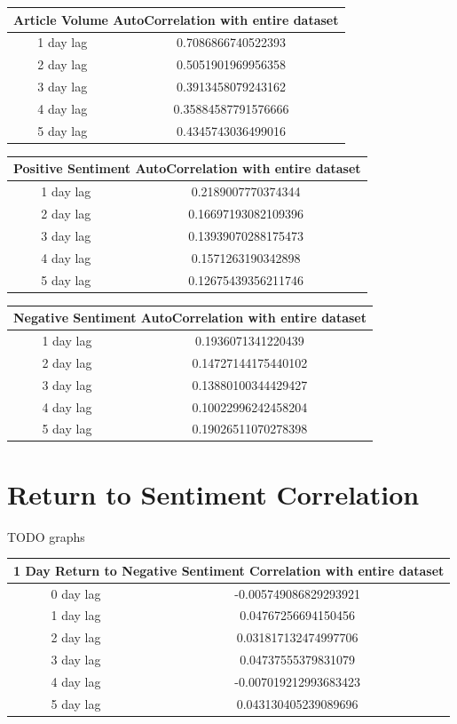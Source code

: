 \begin{center}
\begin{tabular}{ c c }
\hline
\multicolumn{2}{|c|}{Article Volume AutoCorrelation with entire dataset} \\
\hline
1 day lag & 0.7086866740522393 \\
2 day lag & 0.5051901969956358 \\
3 day lag & 0.3913458079243162 \\
4 day lag & 0.35884587791576666 \\
5 day lag & 0.4345743036499016
\end{tabular}
\end{center}

\begin{center}
\begin{tabular}{ c c }
\hline
\multicolumn{2}{|c|}{Positive Sentiment AutoCorrelation with entire dataset} \\
\hline
1 day lag & 0.2189007770374344 \\
2 day lag & 0.16697193082109396 \\
3 day lag & 0.13939070288175473 \\
4 day lag & 0.1571263190342898 \\
5 day lag & 0.12675439356211746
\end{tabular}
\end{center}

\begin{center}
\begin{tabular}{ c c }
\hline
\multicolumn{2}{|c|}{Negative Sentiment AutoCorrelation with entire dataset} \\
\hline
1 day lag & 0.1936071341220439 \\
2 day lag & 0.14727144175440102 \\
3 day lag & 0.13880100344429427 \\
4 day lag & 0.10022996242458204 \\
5 day lag & 0.19026511070278398
\end{tabular}
\end{center}

\section{Return to Sentiment Correlation}

TODO graphs

\begin{center}
\begin{tabular}{ c c }
\hline
\multicolumn{2}{|c|}{1 Day Return to Negative Sentiment Correlation with entire dataset} \\
\hline
0 day lag & -0.005749086829293921 \\
1 day lag & 0.04767256694150456 \\
2 day lag & 0.031817132474997706 \\
3 day lag & 0.04737555379831079 \\
4 day lag & -0.007019212993683423 \\
5 day lag & 0.043130405239089696
\end{tabular}
\end{center}

